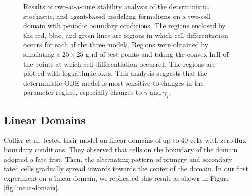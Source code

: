 \documentclass{article}
\begin{document}
\begin{figure}[!htp]
   \caption{Results of two-at-a-time stability analysis of the deterministic, stochastic, and agent-based modelling formalisms on a two-cell domain with periodic boundary conditions. The regions enclosed by the red, blue, and green lines are regions in which cell differentiation occurs for each of the three models. Regions were obtained by simulating a $25 \times 25$ grid of test points and taking the convex hull of the points at which cell differentiation occurred. The regions are plotted with logarithmic axes. This analysis suggests that the deterministic ODE model is most sensitive to changes in the parameter regime, especially changes to $\gamma$ and $\gamma_{I}$.} 
   \label{fig:stability-analysis}
\end{figure}

\subsection*{Linear Domains}

Collier et al. \cite{collier_pattern_1996} tested their model on linear domains of up to $40$ cells with zero-flux boundary conditions.
They observed that cells on the boundary of the domain adopted a fate first.
Then, the alternating pattern of primary and secondary fated cells gradually spread inwards towards the center of the domain.
In our first experiment on a linear domain, we replicated this result as shown in Figure \ref{fig:linear-domain}. 
\end{document}
